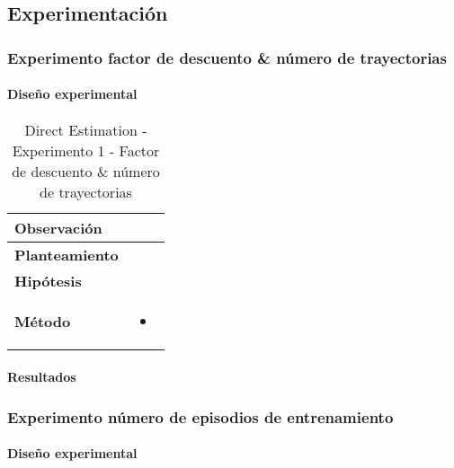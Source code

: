\subsection{Experimentación}

\subsubsection{Experimento factor de descuento \& número de trayectorias}

\paragraph{Diseño experimental}
\begin{table}[H]
    \centering
    \begin{tabularx}{\textwidth}{|p{4cm}|X|} %
        \hline %
        \textbf{Observación} &  
        \\ \hline 
        \textbf{Planteamiento} & 
        \\ \hline 
        \textbf{Hipótesis} & 
        \\ \hline 
        \textbf{Método} & 
        \begin{itemize}
            \item 
        \end{itemize}
        \\ \hline
    \end{tabularx}
    \caption{Direct Estimation - Experimento 1 - Factor de descuento \& número de trayectorias}
    \label{tab:diseñoDirectEstimationExp1}
\end{table}

\paragraph{Resultados}

\subsubsection{Experimento número de episodios de entrenamiento}

\paragraph{Diseño experimental}

